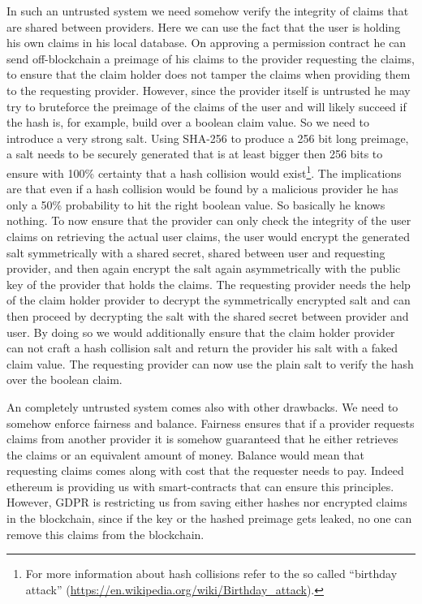 In such an untrusted system we need somehow verify the integrity of claims that are shared between providers. Here we can use the fact that the user is holding his own claims in his local database. On approving a permission contract he can send off-blockchain a preimage of his claims to the provider requesting the claims, to ensure that the claim holder does not tamper the claims when providing them to the requesting provider. However, since the provider itself is untrusted he may try to bruteforce the preimage of the claims of the user and will likely succeed if the hash is, for example, build over a boolean claim value. So we need to introduce a very strong salt. Using SHA-256 to produce a 256 bit long preimage, a salt needs to be securely generated that is at least bigger then 256 bits to ensure with 100\% certainty that a hash collision would exist\footnote{For more information about hash collisions refer to the so called “birthday attack” (\url{https://en.wikipedia.org/wiki/Birthday_attack}).}. The implications are that even if a hash collision would be found by a malicious provider he has only a 50\% probability to hit the right boolean value. So basically he knows nothing. To now ensure that the provider can only check the integrity of the user claims on retrieving the actual user claims, the user would encrypt the generated salt symmetrically with a shared secret, shared between user and requesting provider, and then again encrypt the salt again asymmetrically with the public key of the provider that holds the claims. The requesting provider needs the help of the claim holder provider to decrypt the symmetrically encrypted salt and can then proceed by decrypting the salt with the shared secret between provider and user. By doing so we would additionally ensure that the claim holder provider can not craft a hash collision salt and return the provider his salt with a faked claim value.  The requesting provider can now use the plain salt to verify the hash over the boolean claim.

An completely untrusted system comes also with other drawbacks. We need to somehow enforce fairness and balance. Fairness ensures that if a provider requests claims from another provider it is somehow guaranteed that he either retrieves the claims or an equivalent amount of money. Balance would mean that requesting claims comes along with cost that the requester needs to pay. Indeed ethereum is providing us with smart-contracts that can ensure this principles. However, GDPR is restricting us from saving either hashes nor encrypted claims in the blockchain, since if the key or the hashed preimage gets leaked, no one can remove this claims from the blockchain. 

